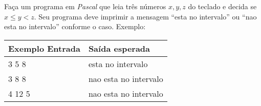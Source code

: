 
\item Faça um programa em \emph{Pascal} que leia três números $x, y, z$ 
do teclado e decida se $x \le y < z$. 
Seu programa deve imprimir a mensagem ``esta no intervalo'' 
ou ``nao esta no intervalo'' conforme o caso. Exemplo:

\begin{center}
\begin{tabular}{|l|l|} \hline
Exemplo Entrada & Saída esperada \\ \hline
3 5 8           & esta no intervalo \\ \hline
3 8 8           & nao esta no intervalo \\ \hline
4 12 5          & nao esta no intervalo \\ \hline
\end{tabular}
\end{center}